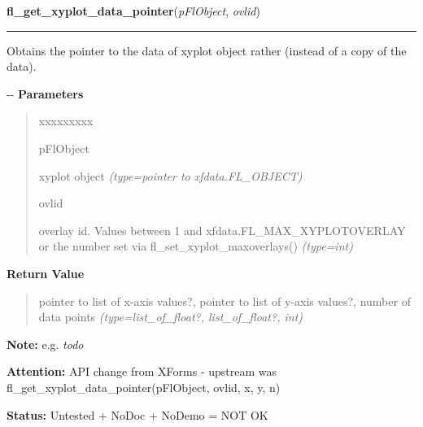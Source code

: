 \hspace{.8\funcindent}\begin{boxedminipage}{\funcwidth}

    \raggedright \textbf{fl\_get\_xyplot\_data\_pointer}(\textit{pFlObject}, \textit{ovlid})

    \vspace{-1.5ex}

    \rule{\textwidth}{0.5\fboxrule}
\setlength{\parskip}{2ex}

Obtains the pointer to the data of xyplot object rather (instead of a
copy of the data).

-{}-
\setlength{\parskip}{1ex}
      \textbf{Parameters}
      \vspace{-1ex}

      \begin{quote}
        \begin{Ventry}{xxxxxxxxx}

          \item[pFlObject]


xyplot object
            {\it (type=pointer to xfdata.FL\_OBJECT)}

          \item[ovlid]


overlay id. Values between 1 and xfdata.FL\_MAX\_XYPLOTOVERLAY or the
number set via fl\_set\_xyplot\_maxoverlays()
            {\it (type=int)}

        \end{Ventry}

      \end{quote}

      \textbf{Return Value}
    \vspace{-1ex}

      \begin{quote}

pointer to list of x-axis values?, pointer to list of y-axis
values?, number of data points
      {\it (type=list\_of\_float?, list\_of\_float?, int)}

      \end{quote}

\textbf{Note:} 
e.g. \emph{todo}


\textbf{Attention:} 
API change from XForms - upstream was
fl\_get\_xyplot\_data\_pointer(pFlObject, ovlid, x, y, n)


\textbf{Status:} 
Untested + NoDoc + NoDemo = NOT OK


    \end{boxedminipage}


